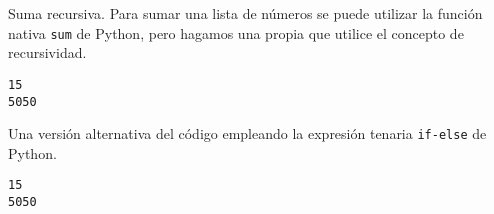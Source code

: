 \begin{code} Suma recursiva.
Para sumar una lista de números se puede utilizar la función nativa
\texttt{sum} de Python, pero hagamos una propia que utilice el concepto
de recursividad.

\begin{Shaded}
\begin{Highlighting}[]
     
         
    \NormalTok{:}
        \NormalTok{ L[}\NormalTok{] }\OperatorTok{+}\NormalTok{ miSuma(L[}\NormalTok{:])}

\NormalTok{(miSuma([}\NormalTok{,}\NormalTok{,}\NormalTok{,}\NormalTok{,}\NormalTok{]))}
\NormalTok{(}\NormalTok{(}\NormalTok{))))}
\end{Highlighting}
\end{Shaded}

\begin{verbatim}
15
5050

\end{verbatim}
\end{code}

\begin{code} Una versión alternativa del código empleando la expresión tenaria \texttt{if-else} de Python.

\begin{Shaded}
\begin{Highlighting}[]
       \NormalTok{ L[}\NormalTok{] }\OperatorTok{+}\NormalTok{ miSuma(L[}\NormalTok{:])}

\NormalTok{(miSuma([}\NormalTok{,}\NormalTok{,}\NormalTok{,}\NormalTok{,}\NormalTok{]))}
\NormalTok{(}\NormalTok{(}\NormalTok{))))}
\end{Highlighting}
\end{Shaded}

\begin{verbatim}
15
5050

\end{verbatim}
\end{code}

